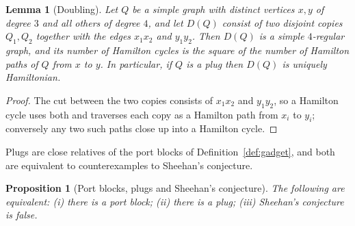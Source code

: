 \documentclass[11pt,a4paper]{article}
\newtheorem{lemma}[theorem]{Lemma}
\newtheorem{proposition}[theorem]{Proposition}
\theoremstyle{definition}
\theoremstyle{remark}
\begin{document}
\begin{lemma}[Doubling]\label{lem:doubling}
Let $Q$ be a simple graph with distinct vertices $x,y$ of degree $3$ and all others of degree $4$, and let $D(Q)$ consist of two disjoint copies $Q_1,Q_2$ together with the edges $x_1x_2$ and $y_1y_2$. Then $D(Q)$ is a simple $4$-regular graph, and its number of Hamilton cycles is the square of the number of Hamilton paths of $Q$ from $x$ to $y$. In particular, if $Q$ is a plug then $D(Q)$ is uniquely Hamiltonian.
\end{lemma}

\begin{proof}
The cut between the two copies consists of $x_1x_2$ and $y_1y_2$, so a Hamilton cycle uses both and traverses each copy as a Hamilton path from $x_i$ to $y_i$; conversely any two such paths close up into a Hamilton cycle.
\end{proof}

Plugs are close relatives of the port blocks of Definition~\ref{def:gadget}, and both are equivalent to counterexamples to Sheehan's conjecture.

\begin{proposition}[Port blocks, plugs and Sheehan's conjecture]\label{prop:portplug}
The following are equivalent: (i) there is a port block; (ii) there is a plug; (iii) Sheehan's conjecture is false.
\end{proposition}
\end{document}
